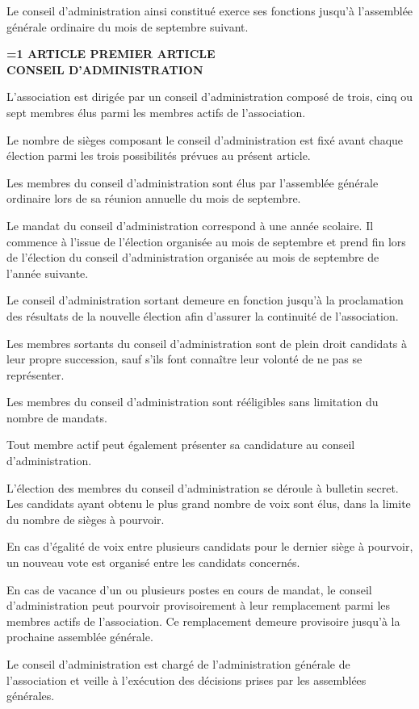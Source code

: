 \documentclass[a4paper,12pt]{article}
\newcounter{statutarticle}
\newcommand{\statutarticle}[2]{%
    \refstepcounter{statutarticle}%
    \label{#2}%
    \vspace{1.2em}%
    \begin{center}
        \textbf{%
            \ifnum\value{statutarticle}=1
                ARTICLE PREMIER%
            \else
                ARTICLE \arabic{statutarticle}%
            \fi
        }\\[0.3em]
        \textbf{#1}
    \end{center}
    \vspace{0.4em}%
}
\begin{document}
Le conseil d'administration ainsi constitué exerce ses fonctions jusqu'à l'assemblée générale ordinaire du mois de septembre suivant.

\statutarticle{CONSEIL D'ADMINISTRATION}{art:ca}

L'association est dirigée par un conseil d'administration composé de trois, cinq ou sept membres élus parmi les membres actifs de l'association.

Le nombre de sièges composant le conseil d'administration est fixé avant chaque élection parmi les trois possibilités prévues au présent article.

Les membres du conseil d'administration sont élus par l'assemblée générale ordinaire lors de sa réunion annuelle du mois de septembre.

Le mandat du conseil d'administration correspond à une année scolaire. Il commence à l'issue de l'élection organisée au mois de septembre et prend fin lors de l'élection du conseil d'administration organisée au mois de septembre de l'année suivante.

Le conseil d'administration sortant demeure en fonction jusqu'à la proclamation des résultats de la nouvelle élection afin d'assurer la continuité de l'association.

Les membres sortants du conseil d'administration sont de plein droit candidats à leur propre succession, sauf s'ils font connaître leur volonté de ne pas se représenter.

Les membres du conseil d'administration sont rééligibles sans limitation du nombre de mandats.

Tout membre actif peut également présenter sa candidature au conseil d'administration.

L'élection des membres du conseil d'administration se déroule à bulletin secret. Les candidats ayant obtenu le plus grand nombre de voix sont élus, dans la limite du nombre de sièges à pourvoir.

En cas d'égalité de voix entre plusieurs candidats pour le dernier siège à pourvoir, un nouveau vote est organisé entre les candidats concernés.

En cas de vacance d'un ou plusieurs postes en cours de mandat, le conseil d'administration peut pourvoir provisoirement à leur remplacement parmi les membres actifs de l'association. Ce remplacement demeure provisoire jusqu'à la prochaine assemblée générale.

Le conseil d'administration est chargé de l'administration générale de l'association et veille à l'exécution des décisions prises par les assemblées générales.
\end{document}
